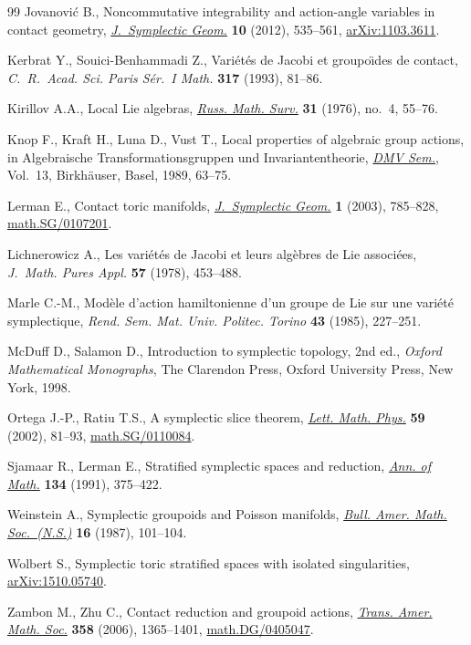 \begin{thebibliography}{99}
Jovanovi\'c B., Noncommutative integrability and action-angle variables in
 contact geometry, \href{https://doi.org/10.4310/JSG.2012.v10.n4.a3}{\textit{J.~Symplectic Geom.}} \textbf{10} (2012), 535--561,
 \href{http://arxiv.org/abs/1103.3611}{arXiv:1103.3611}.

Kerbrat Y., Souici-Benhammadi Z., Vari\'et\'es de {J}acobi et groupo\"\i des de
 contact, \textit{C.~R.~Acad. Sci. Paris S\'er.~I Math.} \textbf{317} (1993),
 81--86.

Kirillov A.A., Local {L}ie algebras, \href{https://doi.org/10.1070/RM1976v031n04ABEH001556}{\textit{Russ. Math. Surv.}} \textbf{31}
 (1976), no.~4, 55--76.

Knop F., Kraft H., Luna D., Vust T., Local properties of algebraic group
 actions, in Algebraische {T}ransformationsgruppen und {I}nvariantentheorie,
 \href{https://doi.org/10.1007/978-3-0348-7662-9_4}{\textit{DMV Sem.}}, Vol.~13, Birkh\"auser, Basel, 1989, 63--75.

Lerman E., Contact toric manifolds, \href{https://doi.org/10.4310/JSG.2001.v1.n4.a6}{\textit{J.~Symplectic Geom.}} \textbf{1}
 (2003), 785--828, \href{http://arxiv.org/abs/math.SG/0107201}{math.SG/0107201}.

Lichnerowicz A., Les vari\'et\'es de {J}acobi et leurs alg\`ebres de {L}ie
 associ\'ees, \textit{J.~Math. Pures Appl.} \textbf{57} (1978), 453--488.

Marle C.-M., Mod\`ele d'action hamiltonienne d'un groupe de {L}ie sur une
 vari\'et\'e symplectique, \textit{Rend. Sem. Mat. Univ. Politec. Torino}
 \textbf{43} (1985), 227--251.

McDuf\/f D., Salamon D., Introduction to symplectic topology, 2nd ed., \textit{Oxford
 Mathematical Monographs}, The Clarendon Press, Oxford University Press, New
 York, 1998.

Ortega J.-P., Ratiu T.S., A symplectic slice theorem, \href{https://doi.org/10.1023/A:1014407427842}{\textit{Lett. Math. Phys.}}
 \textbf{59} (2002), 81--93, \href{http://arxiv.org/abs/math.SG/0110084}{math.SG/0110084}.

Sjamaar R., Lerman E., Stratif\/ied symplectic spaces and reduction, \href{https://doi.org/10.2307/2944350}{\textit{Ann.
 of Math.}} \textbf{134} (1991), 375--422.

Weinstein A., Symplectic groupoids and {P}oisson manifolds, \href{https://doi.org/10.1090/S0273-0979-1987-15473-5}{\textit{Bull. Amer.
 Math. Soc.~(N.S.)}} \textbf{16} (1987), 101--104.

Wolbert S., Symplectic toric stratif\/ied spaces with isolated singularities,
 \href{http://arxiv.org/abs/1510.05740}{arXiv:1510.05740}.

Zambon M., Zhu C., Contact reduction and groupoid actions, \href{https://doi.org/10.1090/S0002-9947-05-03832-8}{\textit{Trans. Amer.
 Math. Soc.}} \textbf{358} (2006), 1365--1401, \href{http://arxiv.org/abs/math.DG/0405047}{math.DG/0405047}.

\end{thebibliography}
